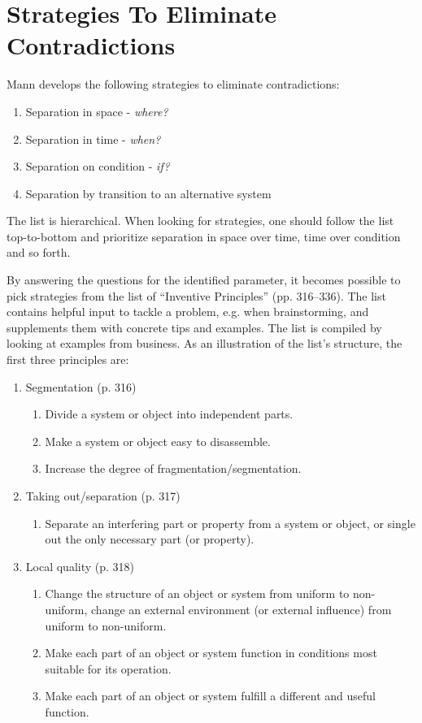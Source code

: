 \documentclass[11pt,a4paper]{article}
\begin{document}
\section{Strategies To Eliminate Contradictions}

Mann develops the following strategies to eliminate contradictions:

\begin{enumerate}
\item Separation in space - \textit{where?}
\item Separation in time - \textit{when?}
\item Separation on condition - \textit{if?}
\item Separation by transition to an alternative system
\end{enumerate}

The list is hierarchical. When looking for strategies, one should follow the
list top-to-bottom and prioritize separation in space over time, time over
condition and so forth.

By answering the questions for the identified parameter, it becomes possible
to pick strategies from the list of \enquote{Inventive Principles}
(pp. 316--336). The list contains helpful input to tackle a problem, e.g. when
brainstorming, and supplements them with concrete tips and examples. The list
is compiled by looking at examples from business. As an illustration of the
list's structure, the first three principles are:
\begin{enumerate}
\item Segmentation (p. 316)
  \begin{enumerate}
  \item Divide a system or object into independent parts.
  \item Make a system or object easy to disassemble.
  \item Increase the degree of fragmentation/segmentation.
  \end{enumerate}
\item Taking out/separation (p. 317)
  \begin{enumerate}
  \item Separate an interfering part or property from a system or object, or
    single out the only necessary part (or property).
  \end{enumerate}
\item Local quality (p. 318)
  \begin{enumerate}
  \item Change the structure of an object or system from uniform to
    non-uniform, change an external environment (or external influence) from
    uniform to non-uniform.
  \item Make each part of an object or system function in conditions most
    suitable for its operation.
  \item Make each part of an object or system fulfill a different and useful
    function.
  \end{enumerate}
\end{enumerate}
\end{document}
